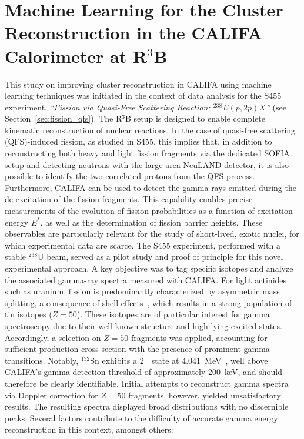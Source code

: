 \section{Machine Learning for the Cluster Reconstruction in the CALIFA Calorimeter at R$^3$B}

This study on improving cluster reconstruction in CALIFA using machine learning techniques was initiated in the context of data analysis for the S455 experiment, \textit{``Fission via Quasi-Free Scattering Reaction: $^{238}$U$(p,2p)X$''} (see Section~\ref{sec:fission_qfs}). The R$^3$B setup is designed to enable complete kinematic reconstruction of nuclear reactions. In the case of quasi-free scattering (QFS)-induced fission, as studied in S455, this implies that, in addition to reconstructing both heavy and light fission fragments via the dedicated SOFIA setup and detecting neutrons with the large-area NeuLAND detector, it is also possible to identify the two correlated protons from the QFS process. Furthermore, CALIFA can be used to detect the gamma rays emitted during the de-excitation of the fission fragments.\newline
This capability enables precise measurements of the evolution of fission probabilities as a function of excitation energy $E^*$, as well as the determination of fission barrier heights. These observables are particularly relevant for the study of short-lived, exotic nuclei, for which experimental data are scarce.\newline
The S455 experiment, performed with a stable $^{238}$U beam, served as a pilot study and proof of principle for this novel experimental approach. A key objective was to tag specific isotopes and analyze the associated gamma-ray spectra measured with CALIFA. For light actinides such as uranium, fission is predominantly characterized by asymmetric mass splitting, a consequence of shell effects~\cite{sartori2013nuclear}, which results in a strong population of tin isotopes ($Z = 50$). These isotopes are of particular interest for gamma spectroscopy due to their well-known structure and high-lying excited states. Accordingly, a selection on $Z = 50$ fragments was applied, accounting for sufficient production cross-section with the presence of prominent gamma transitions. Notably, $^{132}$Sn exhibits a $2^+$ state at 4.041~MeV~\cite{schopper2013excited}, well above CALIFA's gamma detection threshold of approximately 200~keV, and should therefore be clearly identifiable.\newline
Initial attempts to reconstruct gamma spectra via Doppler correction for $Z = 50$ fragments, however, yielded unsatisfactory results. The resulting spectra displayed broad distributions with no discernible peaks. Several factors contribute to the difficulty of accurate gamma energy reconstruction in this context, amongst others:\newline
